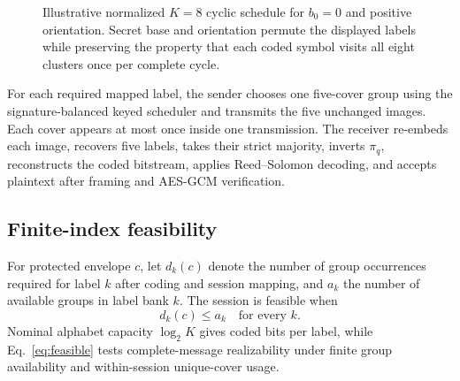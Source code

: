 \begin{figure}[t]
\centering
{}
\caption{Illustrative normalized $K=8$ cyclic schedule for $b_0=0$ and positive orientation. Secret base and orientation permute the displayed labels while preserving the property that each coded symbol visits all eight clusters once per complete cycle.}
\label{fig:cyclic-map}
\end{figure}

For each required mapped label, the sender chooses one five-cover group using the signature-balanced keyed scheduler and transmits the five unchanged images. Each cover appears at most once inside one transmission. The receiver re-embeds each image, recovers five labels, takes their strict majority, inverts $\pi_q$, reconstructs the coded bitstream, applies Reed--Solomon decoding, and accepts plaintext after framing and AES-GCM verification.

\subsection{Finite-index feasibility}

For protected envelope $c$, let $d_k(c)$ denote the number of group occurrences required for label $k$ after coding and session mapping, and $a_k$ the number of available groups in label bank $k$. The session is feasible when
\begin{equation}
 d_k(c)\le a_k \quad \text{for every }k.
 \label{eq:feasible}
\end{equation}
Nominal alphabet capacity $\log_2 K$ gives coded bits per label, while Eq.~\eqref{eq:feasible} tests complete-message realizability under finite group availability and within-session unique-cover usage.

